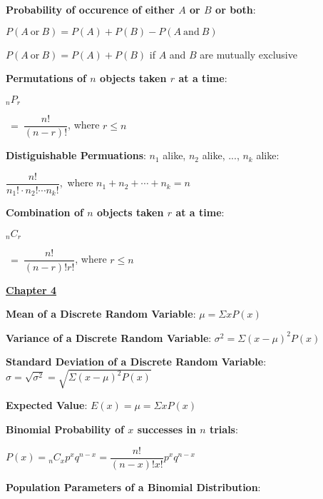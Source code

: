 \documentclass{article}
\begin{document}
\begin{large}
\textbf{Probability of occurence of either $A$ or $B$ or both}:

\hspace{0.1in} $P(A\ \text{or}\ B) = P(A) + P(B) - P(A\ \text{and}\ B)$

\hspace{0.1in} $P(A\ \text{or}\ B) = P(A) + P(B)$ if $A$ and $B$ are mutually exclusive

\textbf{Permutations of $n$ objects taken $r$ at a time}:

\hspace{0.1in} \begin{Large}$\phantom{ }_{n}P_{r}$\end{Large}$\ =\ \dfrac{n!}{(n-r)!}$, where $r \leq n$

\textbf{Distiguishable Permuations}: $n_{1}$ alike, $n_{2}$ alike, ..., $n_{k}$ alike: 

\hspace{0.1in} $\dfrac{n!}{n_{1}!\cdot n_{2}!\cdots n_{k}!}$,\ where $n_{1} + n_{2} + \cdots + n_{k} = n$

\textbf{Combination of $n$ objects taken $r$ at a time}:

\hspace{0.1in} \begin{Large}$\phantom{ }_{n}C_{r}$\end{Large}$\ =\ \dfrac{n!}{(n-r)!r!}$, where $r \leq n$

\vspace{0.25in}

\underline{\textbf{\huge Chapter 4 \phantom{ } \phantom{ } \phantom{ } \phantom{ }}}

\textbf{Mean of a Discrete Random Variable}: $\mu = \Sigma xP(x)$

\textbf{Variance of a Discrete Random Variable}: $\sigma^{2} = \Sigma (x - \mu)^{2}P(x)$

\textbf{Standard Deviation of a Discrete Random Variable}: $\sigma = \sqrt{\sigma^{2}} = \sqrt{\Sigma (x - \mu)^{2}P(x)}$

\textbf{Expected Value}: $E(x) = \mu = \Sigma xP(x)$

\textbf{Binomial Probability of $x$ successes in $n$ trials}:

\hspace{0.1in} \begin{Large}$P(x) = \phantom{ }_{n}C_{x}p^{x}q^{n-x} = \dfrac{n!}{(n-x)!x!}p^{x}q^{n-x}$\end{Large}

\vspace{0.5in}
\textbf{Population Parameters of a Binomial Distribution}:


\end{large}
\end{document}
